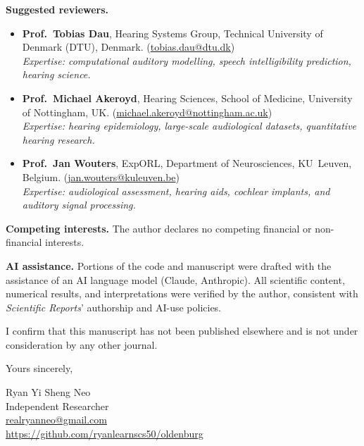 \documentclass[12pt,a4paper]{article}
\begin{document}
\textbf{Suggested reviewers.}
\begin{itemize}
  \item \textbf{Prof.\ Tobias Dau}, Hearing Systems Group, Technical
        University of Denmark (DTU), Denmark.
        (\href{mailto:tobias.dau@dtu.dk}{tobias.dau@dtu.dk})\\
        \textit{Expertise: computational auditory modelling, speech
        intelligibility prediction, hearing science.}

  \item \textbf{Prof.\ Michael Akeroyd}, Hearing Sciences, School of
        Medicine, University of Nottingham, UK.
        (\href{mailto:michael.akeroyd@nottingham.ac.uk}{michael.akeroyd@nottingham.ac.uk})\\
        \textit{Expertise: hearing epidemiology, large-scale audiological
        datasets, quantitative hearing research.}

  \item \textbf{Prof.\ Jan Wouters}, ExpORL, Department of Neurosciences,
        KU~Leuven, Belgium.
        (\href{mailto:jan.wouters@kuleuven.be}{jan.wouters@kuleuven.be})\\
        \textit{Expertise: audiological assessment, hearing aids, cochlear
        implants, and auditory signal processing.}
\end{itemize}

\textbf{Competing interests.}
The author declares no competing financial or non-financial interests.

\textbf{AI assistance.}
Portions of the code and manuscript were drafted with the assistance of an
AI language model (Claude, Anthropic).  All scientific content, numerical
results, and interpretations were verified by the author, consistent with
\textit{Scientific Reports}' authorship and AI-use policies.

I confirm that this manuscript has not been published elsewhere and is not
under consideration by any other journal.

Yours sincerely,

\bigskip
Ryan Yi Sheng Neo\\
Independent Researcher\\
\href{mailto:realryanneo@gmail.com}{realryanneo@gmail.com}\\
\url{https://github.com/ryanlearnscs50/oldenburg}
\end{document}
